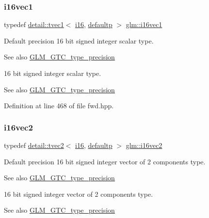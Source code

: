 \subsubsection{\texorpdfstring{i16vec1}{i16vec1}}
{\footnotesize\ttfamily typedef \hyperlink{structglm_1_1detail_1_1tvec1}{detail\+::tvec1}$<$ \hyperlink{group__gtc__type__precision_ga35e5542ca05b29cc256fdafb8503d1fd}{i16}, \hyperlink{namespaceglm_a0f04f086094c747d227af4425893f545a9d21ccd8b5a009ec7eb7677befc3bf51}{defaultp} $>$ \hyperlink{group__gtc__type__precision_gaa3a2fe05ca6a7086c5580922ebda4bf3}{glm\+::i16vec1}}

Default precision 16 bit signed integer scalar type. \begin{DoxySeeAlso}{See also}
\hyperlink{group__gtc__type__precision}{G\+L\+M\+\_\+\+G\+T\+C\+\_\+type\+\_\+precision}
\end{DoxySeeAlso}
16 bit signed integer scalar type. \begin{DoxySeeAlso}{See also}
\hyperlink{group__gtc__type__precision}{G\+L\+M\+\_\+\+G\+T\+C\+\_\+type\+\_\+precision} 
\end{DoxySeeAlso}


Definition at line 468 of file fwd.\+hpp.

\mbox{\label{group__gtc__type__precision_ga13f7a88281faec6a72231dce73ce6129}} 
\subsubsection{\texorpdfstring{i16vec2}{i16vec2}}
{\footnotesize\ttfamily typedef \hyperlink{structglm_1_1detail_1_1tvec2}{detail\+::tvec2}$<$ \hyperlink{group__gtc__type__precision_ga35e5542ca05b29cc256fdafb8503d1fd}{i16}, \hyperlink{namespaceglm_a0f04f086094c747d227af4425893f545a9d21ccd8b5a009ec7eb7677befc3bf51}{defaultp} $>$ \hyperlink{group__gtc__type__precision_ga13f7a88281faec6a72231dce73ce6129}{glm\+::i16vec2}}

Default precision 16 bit signed integer vector of 2 components type. \begin{DoxySeeAlso}{See also}
\hyperlink{group__gtc__type__precision}{G\+L\+M\+\_\+\+G\+T\+C\+\_\+type\+\_\+precision}
\end{DoxySeeAlso}
16 bit signed integer vector of 2 components type. \begin{DoxySeeAlso}{See also}
\hyperlink{group__gtc__type__precision}{G\+L\+M\+\_\+\+G\+T\+C\+\_\+type\+\_\+precision} 
\end{DoxySeeAlso}


